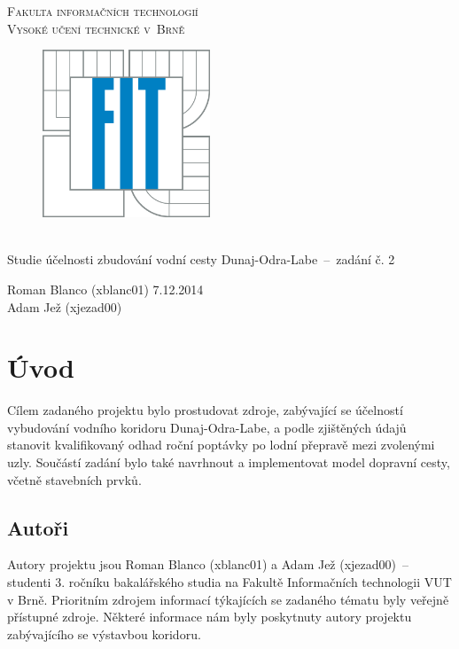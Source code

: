 \documentclass[11pt,a4paper]{article}
\begin{document}
  \begin{titlepage}
    \begin{center}
      \Huge
      \textsc{Fakulta informačních technologií\\ Vysoké učení technické v~Brně}
      \vspace{100px}
      \begin{figure}[!h]
        \centering
        \includegraphics[height=5cm]{logo}
      \end{figure}
      \\[50mm]
      \LARGE{Studie účelnosti zbudování vodní cesty Dunaj-Odra-Labe \,--\, 
             zadání č. 2}
      \vfill
    \end{center}
    \Large{Roman Blanco (xblanc01) \hfill 7.12.2014 \\
           Adam Jež (xjezad00)}
  \end{titlepage}

  \tableofcontents
  \newpage

  \section{Úvod}

    Cílem zadaného projektu bylo prostudovat zdroje, zabývající se účelností
    vybudování vodního koridoru Dunaj-Odra-Labe, a podle zjištěných údajů stanovit kvalifikovaný odhad roční poptávky po lodní přepravě mezi zvolenými uzly. Součástí zadání bylo také
    navrhnout a implementovat model dopravní cesty, včetně stavebních prvků.

    \subsection{Autoři}

      Autory projektu jsou Roman Blanco (xblanc01) a Adam Jež (xjezad00) \,--\,
      studenti 3. ročníku bakalářského studia na Fakultě Informačních
      technologii VUT v Brně. Prioritním zdrojem informací týkajících se zadaného tématu byly veřejně přístupné zdroje. Některé informace nám byly poskytnuty autory projektu zabývajícího se výstavbou koridoru.
\end{document}
